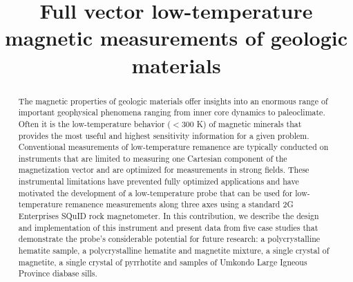 \documentclass[draft,gc]{AGUTeX}
\begin{document}
%
%


\title{Full vector low-temperature magnetic measurements of geologic materials}

%
%




%
%




%
%


\begin{abstract}
The magnetic properties of geologic materials offer insights into an enormous range of important geophysical phenomena ranging from inner core dynamics to paleoclimate. Often it is the low-temperature behavior ($<$300 K) of magnetic minerals that provides the most useful and highest sensitivity information for a given problem. Conventional measurements of low-temperature remanence are typically conducted on instruments that are limited to measuring one Cartesian component of the magnetization vector and are optimized for measurements in strong fields. These instrumental limitations have prevented fully optimized applications and have motivated the development of a low-temperature probe that can be used for low-temperature remanence measurements along three axes using a standard 2G Enterprises SQuID rock magnetometer. In this contribution, we describe the design and implementation of this instrument and present data from five case studies that demonstrate the probe's considerable potential for future research: a polycrystalline hematite sample, a polycrystalline hematite and magnetite mixture, a single crystal of magnetite, a single crystal of pyrrhotite and samples of  Umkondo Large Igneous Province diabase sills.
\end{abstract}
\end{document}
